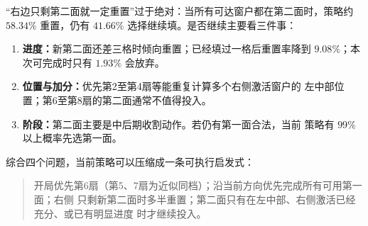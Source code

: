 \documentclass[UTF8,11pt,openany]{ctexrep}
\begin{document}
“右边只剩第二面就一定重置”过于绝对：当所有可达窗户都在第二面时，策略约
$58.34\%$ 重置，仍有 $41.66\%$ 选择继续填。是否继续主要看三件事：

\begin{enumerate}[leftmargin=*]
    \item \textbf{进度：}新第二面还差三格时倾向重置；已经填过一格后重置率降到
    $9.08\%$；本次可完成时只有 $1.93\%$ 会放弃。
    \item \textbf{位置与加分：}优先第2至第4扇等能重复计算多个右侧激活窗户的
    左中部位置；第6至第8扇的第二面通常不值得投入。
    \item \textbf{阶段：}第二面主要是中后期收割动作。若仍有第一面合法，当前
    策略有 $99\%$ 以上概率先选第一面。
\end{enumerate}

综合四个问题，当前策略可以压缩成一条可执行启发式：
\begin{quote}
开局优先第6扇（第5、7扇为近似同档）；沿当前方向优先完成所有可用第一面；右侧
只剩新第二面时多半重置；第二面只有在左中部、右侧激活已经充分、或已有明显进度
时才继续投入。
\end{quote}
\end{document}
